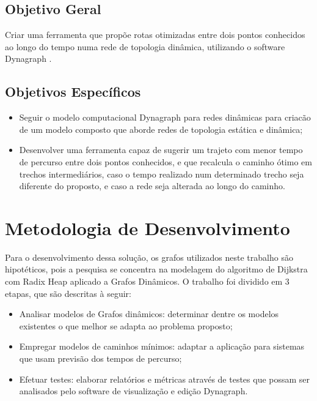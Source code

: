 \subsection{Objetivo Geral}
Criar uma ferramenta que propõe rotas otimizadas entre dois pontos conhecidos ao longo do tempo
numa rede de topologia dinâmica, utilizando o software Dynagraph \cite{dynagraph}.

\subsection{Objetivos Específicos}
\begin{itemize}
 \item Seguir o modelo computacional Dynagraph \cite{dynagraph} para redes dinâmicas para criacão de um modelo composto
 que aborde redes de topologia estática e dinâmica;
 \item Desenvolver uma ferramenta capaz de sugerir um trajeto com menor tempo
 de percurso entre dois pontos conhecidos, e que recalcula o caminho ótimo em trechos
 intermediários, caso o tempo realizado num determinado trecho seja diferente do proposto,
 e caso a rede seja alterada ao longo do caminho.
\end{itemize}

\section{Metodologia de Desenvolvimento}

Para o desenvolvimento dessa solução, os grafos utilizados neste trabalho são hipotéticos,
pois a pesquisa se concentra na modelagem do algoritmo de Dijkstra com Radix Heap aplicado a Grafos Dinâmicos.
O trabalho foi dividido em 3 etapas, que são descritas à seguir:

\begin{itemize}
 \item Analisar modelos de Grafos dinâmicos: determinar dentre os modelos existentes o que melhor
 se adapta ao problema proposto;

 \item Empregar modelos de caminhos mínimos: adaptar a aplicação para sistemas que usam 
 previsão dos tempos de percurso;

 \item Efetuar testes: elaborar relatórios e métricas através de testes que possam ser analisados pelo
 software de visualização e edição Dynagraph.
\end{itemize}

